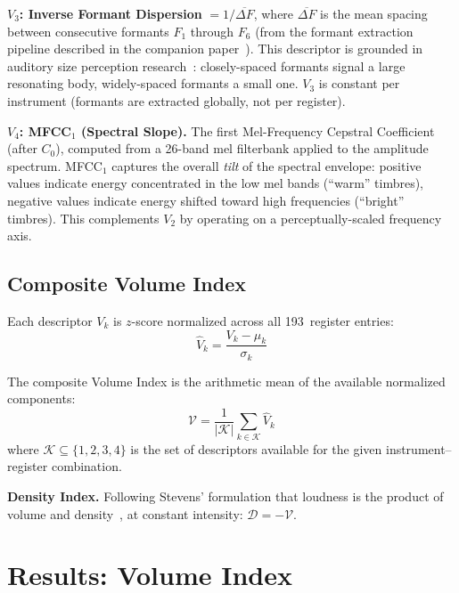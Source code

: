 \documentclass[journal]{IEEEtran}
\begin{document}
\textbf{$V_3$: Inverse Formant Dispersion} $= 1 / \overline{\Delta F}$, where $\overline{\Delta F}$ is the mean spacing between consecutive formants $F_1$ through $F_6$ (from the formant extraction pipeline described in the companion paper~\cite{Maresz2025}). This descriptor is grounded in auditory size perception research~\cite{Fitch1997, VanDinther2006}: closely-spaced formants signal a large resonating body, widely-spaced formants a small one. $V_3$ is constant per instrument (formants are extracted globally, not per register).

\textbf{$V_4$: MFCC$_1$ (Spectral Slope).} The first Mel-Frequency Cepstral Coefficient (after $C_0$), computed from a 26-band mel filterbank applied to the amplitude spectrum. MFCC$_1$ captures the overall \emph{tilt} of the spectral envelope: positive values indicate energy concentrated in the low mel bands (``warm'' timbres), negative values indicate energy shifted toward high frequencies (``bright'' timbres). This complements $V_2$ by operating on a perceptually-scaled frequency axis.

\subsection{Composite Volume Index}

Each descriptor $V_k$ is $z$-score normalized across all 193~register entries:
\begin{equation}
\hat{V}_k = \frac{V_k - \mu_k}{\sigma_k}
\end{equation}

The composite Volume Index is the arithmetic mean of the available normalized components:
\begin{equation}
\mathcal{V} = \frac{1}{|\mathcal{K}|} \sum_{k \in \mathcal{K}} \hat{V}_k
\end{equation}
where $\mathcal{K} \subseteq \{1,2,3,4\}$ is the set of descriptors available for the given instrument--register combination.

\textbf{Density Index.} Following Stevens' formulation that loudness is the product of volume and density~\cite{Stevens1965}, at constant intensity: $\mathcal{D} = -\mathcal{V}$.

\section{Results: Volume Index}
\label{sec:volume}
\end{document}
